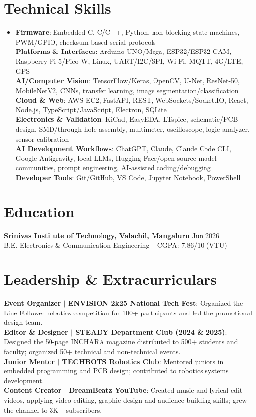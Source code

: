 \documentclass[a4paper,10pt]{article}
\begin{document}
\section{Technical Skills}
\begin{itemize}[leftmargin=0.0in,label={},itemsep=0pt,parsep=0pt,topsep=0pt,partopsep=0pt]
  \item\small
    \textbf{Firmware}: Embedded C, C/C++, Python, non-blocking state machines, PWM/GPIO, checksum-based serial protocols \\
    \textbf{Platforms \& Interfaces}: Arduino UNO/Mega, ESP32/ESP32-CAM, Raspberry Pi 5/Pico W, Linux, UART/I2C/SPI, Wi-Fi, MQTT, 4G/LTE, GPS \\
    \textbf{AI/Computer Vision}: TensorFlow/Keras, OpenCV, U-Net, ResNet-50, MobileNetV2, CNNs, transfer learning, image segmentation/classification \\
    \textbf{Cloud \& Web}: AWS EC2, FastAPI, REST, WebSockets/Socket.IO, React, Node.js, TypeScript/JavaScript, Electron, SQLite \\
    \textbf{Electronics \& Validation}: KiCad, EasyEDA, LTspice, schematic/PCB design, SMD/through-hole assembly, multimeter, oscilloscope, logic analyzer, sensor calibration \\
    \textbf{AI Development Workflows}: ChatGPT, Claude, Claude Code CLI, Google Antigravity, local LLMs, Hugging Face/open-source model communities, prompt engineering, AI-assisted coding/debugging \\
    \textbf{Developer Tools}: Git/GitHub, VS Code, Jupyter Notebook, PowerShell
\end{itemize}
\vspace{-2pt}

\section{Education}
{\small \textbf{Srinivas Institute of Technology, Valachil, Mangaluru} \hfill Jun 2026 \\ B.E. Electronics \& Communication Engineering -- CGPA: 7.86/10 (VTU)}
\vspace{-1pt}

\section{Leadership \& Extracurriculars}
{\small
\textbf{Event Organizer $|$ ENVISION 2k25 National Tech Fest}: Organized the Line Follower robotics competition for 100+ participants and led the promotional design team.\\[-1pt]
\textbf{Editor \& Designer $|$ STEADY Department Club (2024 \& 2025)}: Designed the 50-page INCHARA magazine distributed to 500+ students and faculty; organized 50+ technical and non-technical events.\\[-1pt]
\textbf{Junior Mentor $|$ TECHBOTS Robotics Club}: Mentored juniors in embedded programming and PCB design; contributed to robotics systems development.\\[-1pt]
\textbf{Content Creator $|$ DreamBeatz YouTube}: Created music and lyrical-edit videos, applying video editing, graphic design and audience-building skills; grew the channel to 3K+ subscribers.
}
\end{document}
